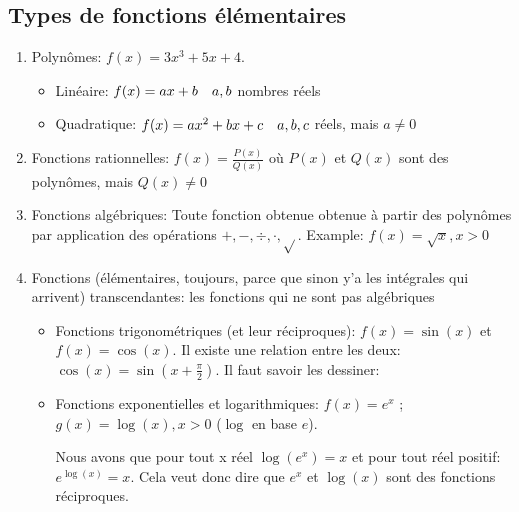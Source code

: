 \documentclass{article}
\begin{document}
\subsection{Types de fonctions élémentaires}
\begin{enumerate}[left=0pt]
    \item Polynômes: $f\left(x\right) = 3x^3 + 5x + 4$. 
        \begin{itemize}
            \item Linéaire: $f\left(x\right) = ax + b \mathspace a,b$ nombres réels
            \item Quadratique: $f\left(x\right) = ax^2 + bx + c \mathspace a,b,c$ réels, mais $a\neq 0$
        \end{itemize}
    \item Fonctions rationnelles: $f\left(x\right) = \frac{P\left(x\right)}{Q\left(x\right)}$ où $P\left(x\right)$ et $Q\left(x\right)$ sont des polynômes, mais $Q\left(x\right) \neq 0$
    \item Fonctions algébriques: Toute fonction obtenue obtenue à partir des polynômes par application des opérations $+, -, \div, \cdot, \sqrt{}$.
    Example: $f\left(x\right) = \sqrt{x}, x > 0$ 
\item Fonctions (élémentaires, toujours, parce que sinon y'a les intégrales qui arrivent) transcendantes: les fonctions qui ne sont pas algébriques
        \begin{itemize}
            \item Fonctions trigonométriques (et leur réciproques): $f\left(x\right) = \sin\left(x\right)$ et $f\left(x\right) = \cos\left(x\right)$. Il existe une relation entre les deux: $\cos\left(x\right) = \sin\left(x + \frac{\pi}{2}\right)$. Il faut savoir les dessiner:

            \item Fonctions exponentielles et logarithmiques: $f\left(x\right) = e^x$ ; $g\left(x\right) = \log\left(x\right), x > 0$ ($\log$ en base $e$). 

                Nous avons que pour tout x réel $\log\left(e^x\right) = x$ et pour tout réel positif: $e^{\log\left(x\right)} = x$. Cela veut donc dire que $e^x$ et $\log\left(x\right)$ sont des fonctions réciproques. 
        \end{itemize}
\end{enumerate}

 
\end{document}
